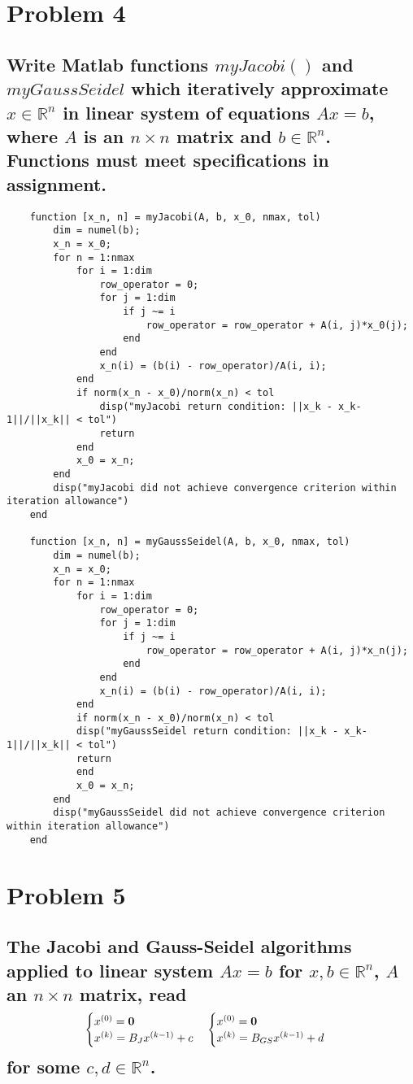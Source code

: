 \documentclass[11pt, letterpaper]{article}
\begin{document}
\section*{Problem 4}
\subsection*{\normalfont Write Matlab functions $myJacobi()$ and $myGaussSeidel$ which iteratively
approximate $x\in\mathbb{R}^n$ in linear system of equations $Ax=b$, where $A$ is an $n\times n$ matrix
and $b\in\mathbb{R}^n$. Functions must meet specifications in assignment.}
\begin{verbatim}
    function [x_n, n] = myJacobi(A, b, x_0, nmax, tol)
        dim = numel(b);
        x_n = x_0;
        for n = 1:nmax
            for i = 1:dim
                row_operator = 0;
                for j = 1:dim
                    if j ~= i
                        row_operator = row_operator + A(i, j)*x_0(j);
                    end
                end
                x_n(i) = (b(i) - row_operator)/A(i, i);
            end
            if norm(x_n - x_0)/norm(x_n) < tol
                disp("myJacobi return condition: ||x_k - x_k-1||/||x_k|| < tol")
                return
            end
            x_0 = x_n;
        end
        disp("myJacobi did not achieve convergence criterion within iteration allowance")
    end

    function [x_n, n] = myGaussSeidel(A, b, x_0, nmax, tol)
        dim = numel(b);
        x_n = x_0;
        for n = 1:nmax
            for i = 1:dim
                row_operator = 0;
                for j = 1:dim
                    if j ~= i
                        row_operator = row_operator + A(i, j)*x_n(j);
                    end
                end
                x_n(i) = (b(i) - row_operator)/A(i, i);
            end
            if norm(x_n - x_0)/norm(x_n) < tol
            disp("myGaussSeidel return condition: ||x_k - x_k-1||/||x_k|| < tol")
            return
            end
            x_0 = x_n;
        end
        disp("myGaussSeidel did not achieve convergence criterion within iteration allowance")
    end
\end{verbatim}
\section*{Problem 5}
\subsection*{\normalfont The Jacobi and Gauss-Seidel algorithms applied to linear system $Ax=b$ 
for $x,b\in\mathbb{R}^n$, $A$ an $n\times n$ matrix, read
\begin{align*}
    \begin{cases}
        x^{(0)}={\bf 0}\\
        x^{(k)}=B_Jx^{(k - 1)} + c
    \end{cases}
    \begin{cases}
        x^{(0)}={\bf 0}\\
        x^{(k)}=B_{GS}x^{(k - 1)} + d
    \end{cases}
\end{align*}
for some $c,d\in\mathbb{R}^n$.
}
\end{document}
